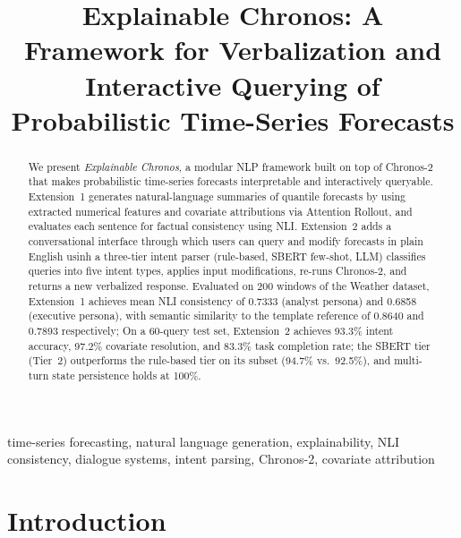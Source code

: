 \documentclass[conference]{IEEEtran}
\begin{document}
\title{Explainable Chronos: A Framework for Verbalization and Interactive Querying of Probabilistic Time-Series Forecasts}

\author{
}

\maketitle

\begin{abstract}
We present \textit{Explainable Chronos}, a modular NLP framework built on top of Chronos-2 that makes probabilistic time-series forecasts interpretable and interactively queryable. Extension~1 generates natural-language summaries of quantile forecasts by using  extracted numerical features and covariate attributions via Attention Rollout, and evaluates each sentence for factual consistency using NLI. Extension~2 adds a conversational interface through which users can query and modify forecasts in plain English usinh a three-tier intent parser (rule-based, SBERT few-shot, LLM) classifies queries into five intent types, applies input modifications, re-runs Chronos-2, and returns a new verbalized response. Evaluated on 200 windows of the Weather dataset, Extension~1 achieves mean NLI consistency of 0.7333 (analyst persona) and 0.6858 (executive persona), with semantic similarity to the template reference of 0.8640 and 0.7893 respectively; On a 60-query test set, Extension~2 achieves 93.3\% intent accuracy, 97.2\% covariate resolution, and 83.3\% task completion rate; the SBERT tier (Tier~2) outperforms the rule-based tier on its subset (94.7\% vs.\ 92.5\%), and multi-turn state persistence holds at 100\%.
\end{abstract}

\begin{IEEEkeywords}
time-series forecasting, natural language generation, explainability, NLI consistency, dialogue systems, intent parsing, Chronos-2, covariate attribution
\end{IEEEkeywords}


\section{Introduction}
\end{document}
